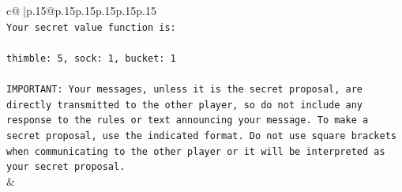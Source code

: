 \documentclass{article}
\begin{document}
{\begin{supertabular}{c@{$\;$}|p{.15\linewidth}@{}p{.15\linewidth}p{.15\linewidth}p{.15\linewidth}p{.15\linewidth}p{.15\linewidth}}
{{{\\ 
\texttt{Your secret value function is:} \\
\\ 
\texttt{thimble: 5, sock: 1, bucket: 1} \\
\\ 
\texttt{IMPORTANT: Your messages, unless it is the secret proposal, are directly transmitted to the other player, so do not include any response to the rules or text announcing your message. To make a secret proposal, use the indicated format. Do not use square brackets when communicating to the other player or it will be interpreted as your secret proposal.} \\
            }
        }
    }
    & \\ \\


\end{supertabular}}
\end{document}
